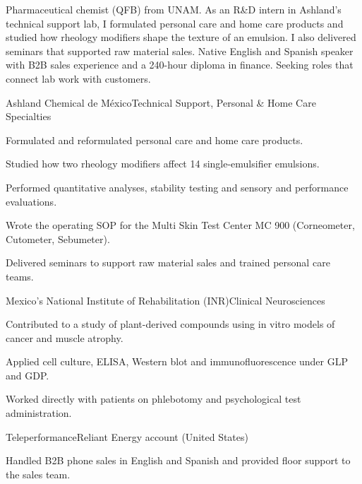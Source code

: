 \documentclass[letterpaper]{article}
\begin{document}
\makecvheader

Pharmaceutical chemist (QFB) from UNAM. As an R\&D intern in Ashland’s technical support lab, I formulated personal care and home care products and studied how rheology modifiers shape the texture of an emulsion. I also delivered seminars that supported raw material sales. Native English and Spanish speaker with B2B sales experience and a 240-hour diploma in finance. Seeking roles that connect lab work with customers.

        {Ashland Chemical de México}{Technical Support, Personal \& Home Care Specialties}
\begin{cvitems}
  \item Formulated and reformulated personal care and home care products.
  \item Studied how two rheology modifiers affect 14 single-emulsifier emulsions.
  \item Performed quantitative analyses, stability testing and sensory and performance evaluations.
  \item Wrote the operating SOP for the Multi Skin Test Center MC 900 (Corneometer, Cutometer, Sebumeter).
  \item Delivered seminars to support raw material sales and trained personal care teams.
\end{cvitems}

        {Mexico’s National Institute of Rehabilitation (INR)}{Clinical Neurosciences}
\begin{cvitems}
  \item Contributed to a study of plant-derived compounds using in vitro models of cancer and muscle atrophy.
  \item Applied cell culture, ELISA, Western blot and immunofluorescence under GLP and GDP.
  \item Worked directly with patients on phlebotomy and psychological test administration.
\end{cvitems}

        {Teleperformance}{Reliant Energy account (United States)}
\begin{cvitems}
  \item Handled B2B phone sales in English and Spanish and provided floor support to the sales team.
\end{cvitems}
\end{document}

